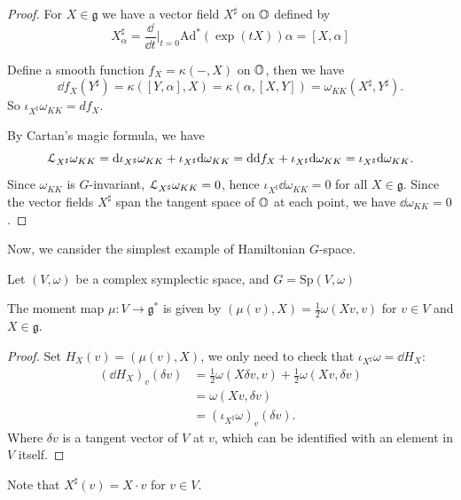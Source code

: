 \documentclass[12pt]{amsart}
\numberwithin{equation}{section}
\newcommand{\fg}{\mathfrak{g}} \newcommand{\fh}{\mathfrak{h}} \newcommand{\fk}{\mathfrak{k}}
\newcommand{\Sp}{{\mathrm{Sp}}} \newcommand{\GSp}{{\mathrm{GSp}}}
\newcommand{\Ad}{{\mathrm{Ad}}}   \newcommand{\ad}{{\mathrm{ad}}}
\newcommand{\bra}[1]{\left(#1\right)}
\begin{document}
\begin{proof}
  For $X \in \fg$ we have a vector field $X^{\sharp}$ on ${\mathbb {O}}$ defined by 
  \[
    \boxed{\displaystyle X^{\sharp}_{\alpha} = \frac{\dd}{\dd t} \bigg|_{t=0} \Ad^*(\exp(tX))\alpha = [X,\alpha]}
  \]
  
  Define a smooth function $f_{X} = \kappa \bra{-,X}$ on ${\mathbb {O}}$, then we have
  \[  \dd f_{X}(Y^{\sharp}) = \kappa([Y,\alpha],X) = \kappa(\alpha,[X,Y]) = \omega_{KK}(X^{\sharp},Y^{\sharp}). \]
  So $\iota_{X^{\sharp}} \omega_{KK} = df_{X}$.

  By Cartan's magic formula, we have
  \[  {\mathcal {L}}_{X^{\sharp}} \omega_{KK} = \mathrm{d} \iota_{X^{\sharp}} \omega_{KK} + \iota_{X^{\sharp}} \mathrm{d} \omega_{KK} = \mathrm{d} \mathrm{d} f_{X} + \iota_{X^{\sharp}} \mathrm{d} \omega_{KK} = \iota_{X^{\sharp}} \mathrm{d} \omega_{KK}. \]
  Since $\omega_{KK}$ is $G$-invariant, ${\mathcal {L}}_{X^{\sharp}} \omega_{KK} = 0$, hence $\iota_{X^{\sharp}} \dd \omega_{KK} = 0$ for all $X \in \fg$. Since the vector fields $X^{\sharp}$ span the tangent space of ${\mathbb {O}}$ at each point, we have $\dd \omega_{KK} = 0$.
\end{proof}



Now, we cansider the simplest example of Hamiltonian $G$-space. 

Let $(V,\omega)$ be a complex symplectic space, and $G = \Sp(V,\omega)$

\begin{prop}
  The moment map $\mu : V \to \fg^*$ is given by $\bra{\mu(v),X} = \frac{1}{2}\omega(Xv,v)$ for $v \in V$ and $X \in \fg$.
\end{prop}

\begin{proof}
  Set $H_X(v) = \bra{\mu(v),X}$, we only need to check that $\iota_{X^{\sharp}} \omega = \dd H_X$:
  \begin{align*}
    (\dd H_X)_{v}(\delta v) &= \frac{1}{2} \omega(X \delta v, v) + \frac{1}{2} \omega(Xv, \delta v) \\
    &= \omega(Xv, \delta v) \\
    &= (\iota_{X^{\sharp}} \omega )_{v}(\delta v).
  \end{align*}
  Where $\delta v$ is a tangent vector of $V$ at $v$, which can be identified with an element in $V$ itself.
\end{proof}

\begin{rk}
  Note that $X^{\sharp}(v) = X \cdot v$ for $v \in V$.
\end{rk}
\end{document}
